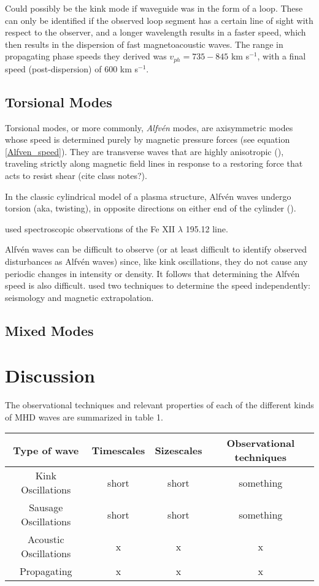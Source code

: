 \documentclass[preprint2]{aastex}
\begin{document}
Could possibly be the kink mode if waveguide was in
the form of a loop. These can only be identified if the observed loop
segment has a certain line of sight with respect to the observer,
and a longer wavelength results in a faster speed, which then results
in the dispersion of fast magnetoacoustic waves. The range in
propagating phase speeds they derived was
$ v_{ph} = 735 - 845 $ km s$^{-1}$, with a final speed
(post-dispersion) of 600 km s$^{-1}$.


\subsection{Torsional Modes}
Torsional modes, or more commonly, \emph{Alfv\'en} modes, are axisymmetric
modes whose speed is determined purely by magnetic pressure forces
(see equation \ref{Alfven_speed}).
They are transverse waves that are highly anisotropic (\cite{intro}),
traveling strictly along magnetic field lines in response
to a restoring force that acts to resist shear (cite class notes?).

In the classic cylindrical model of a plasma structure,
Alfv\'en waves undergo torsion (aka, twisting), in opposite directions on
either end of the cylinder (\cite{Nak}).

\cite{tor_1} used spectroscopic observations of the Fe
{\footnotesize XII} $\lambda$ 195.12 line.

Alfv\'en waves can be difficult to observe (or at least difficult to
identify observed disturbances as Alfv\'en waves) since, like kink
oscillations, they do not cause any periodic changes in intensity or density.
It follows that determining the Alfv\'en speed is also difficult.
\cite{tor_2} used two techniques to determine the speed independently:
seismology and magnetic extrapolation.

\subsection{Mixed Modes}

\section{Discussion}\label{disc}
The observational techniques and relevant properties of each of the different
kinds of MHD waves are summarized in table 1.
\begin{table*}[ht]
    \centering
    \begin{tabular}{c c c c}
        \hline\hline
        Type of wave &
        Timescales &
        Sizescales &
        Observational techniques\\
        \hline
        Kink Oscillations & short & short & something\\
        Sausage Oscillations & short & short & something\\
        Acoustic Oscillations & x & x & x\\
        Propagating & x & x & x\\
        \hline\hline
    \end{tabular}
\end{table*}
\end{document}
